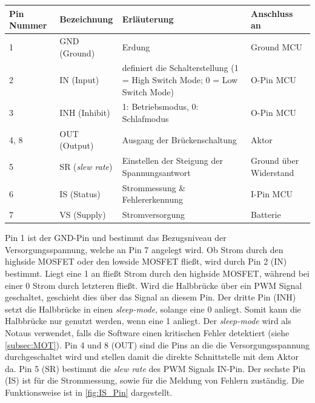 \begin{table}[H]
	\centering
		\begin{tabular}{l p{} p{8cm} p{3cm}}
			\textbf{Pin Nummer} & \textbf{Bezeichnung} & \textbf{Erläuterung} & \textbf{Anschluss an} \\ \hline
			1 & GND (Ground) & Erdung & Ground MCU \\
			2 & IN (Input) & definiert die Schalterstellung (1 = High Switch Mode; 0 = Low Switch Mode) & O-Pin MCU \\
			3 & INH (Inhibit) & 1: Betriebsmodus, 0: Schlafmodus & O-Pin MCU \\
			4, 8 & OUT (Output) & Ausgang der Brückenschaltung & Aktor \\
			5 & SR (\textit{slew rate}) & Einstellen der Steigung der Spannungsantwort & Ground über Widerstand \\
			6 & IS (Status) & Strommessung \& Fehlererkennung & I-Pin MCU\\
			7 & VS (Supply) & Stromversorgung & Batterie\\
		\end{tabular}
	
	\label{tab:Pinverteilung}
\end{table}\noindent
Pin 1 ist der GND-Pin und bestimmt das Bezugsniveau der Versorgungsspannung, welche an Pin 7 angelegt wird. Ob Strom durch den highside MOSFET oder den lowside MOSFET fließt, wird durch Pin 2 (IN) bestimmt. Liegt eine 1 an fließt Strom durch den highside MOSFET, während bei einer 0 Strom durch letzteren fließt. Wird die Halbbrücke über ein PWM Signal geschaltet, geschieht dies über das Signal an diesem Pin. Der dritte Pin (INH) setzt die Halbbrücke in einen \textit{sleep-mode}, solange eine 0 anliegt. Somit kann die Halbbrücke nur genutzt werden, wenn eine 1 anliegt. Der \textit{sleep-mode} wird als Notaus verwendet, falls die Software einen kritischen Fehler detektiert (siehe \autoref{subsec:MOT}). Pin 4 und 8 (OUT) sind die Pins an die die Versorgungsspannung durchgeschaltet wird und stellen damit die direkte Schnittstelle mit dem Aktor da. Pin 5 (SR) bestimmt die \textit{slew rate} des PWM Signals IN-Pin. Der sechste Pin (IS) ist für die Strommessung, sowie für die Meldung von Fehlern zuständig. Die Funktionsweise ist in \autoref{fig:IS_Pin} dargestellt.\\

